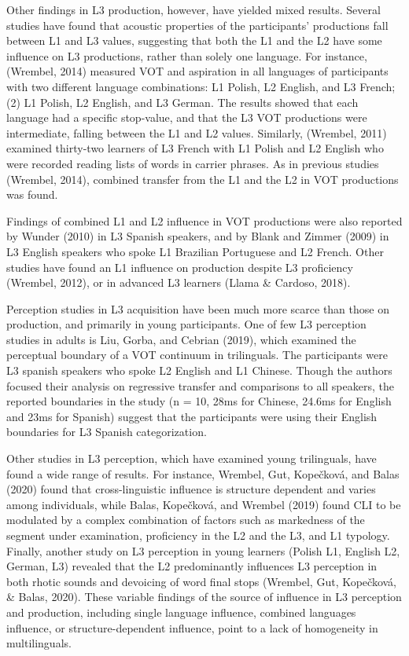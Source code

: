 \documentclass[
  english,
  man]{apa6}
\begin{document}
Other findings in L3 production, however, have yielded mixed results.
Several studies have found that acoustic properties of the participants' productions fall between L1 and L3 values, suggesting that both the L1 and the L2 have some influence on L3 productions, rather than solely one language.
For instance, (Wrembel, 2014) measured VOT and aspiration in all languages of participants with two different language combinations: L1 Polish, L2 English, and L3 French; (2) L1 Polish, L2 English, and L3 German.
The results showed that each language had a specific stop-value, and that the L3 VOT productions were intermediate, falling between the L1 and L2 values.
Similarly, (Wrembel, 2011) examined thirty-two learners of L3 French with L1 Polish and L2 English who were recorded reading lists of words in carrier phrases.
As in previous studies (Wrembel, 2014), combined transfer from the L1 and the L2 in VOT productions was found.

Findings of combined L1 and L2 influence in VOT productions were also reported by Wunder (2010) in L3 Spanish speakers, and by Blank and Zimmer (2009) in L3 English speakers who spoke L1 Brazilian Portuguese and L2 French.
Other studies have found an L1 influence on production despite L3 proficiency (Wrembel, 2012), or in advanced L3 learners (Llama \& Cardoso, 2018).

Perception studies in L3 acquisition have been much more scarce than those on production, and primarily in young participants.
One of few L3 perception studies in adults is Liu, Gorba, and Cebrian (2019), which examined the perceptual boundary of a VOT continuum in trilinguals.
The participants were L3 spanish speakers who spoke L2 English and L1 Chinese.
Though the authors focused their analysis on regressive transfer and comparisons to all speakers, the reported boundaries in the study (n = 10, 28ms for Chinese, 24.6ms for English and 23ms for Spanish) suggest that the participants were using their English boundaries for L3 Spanish categorization.

Other studies in L3 perception, which have examined young trilinguals, have found a wide range of results.
For instance, Wrembel, Gut, Kopečková, and Balas (2020) found that cross-linguistic influence is structure dependent and varies among individuals, while Balas, Kopečková, and Wrembel (2019) found CLI to be modulated by a complex combination of factors such as markedness of the segment under examination, proficiency in the L2 and the L3, and L1 typology.
Finally, another study on L3 perception in young learners (Polish L1, English L2, German, L3) revealed that the L2 predominantly influences L3 perception in both rhotic sounds and devoicing of word final stops (Wrembel, Gut, Kopečková, \& Balas, 2020). These variable findings of the source of influence in L3 perception and production, including single language influence, combined languages influence, or structure-dependent influence, point to a lack of homogeneity in multilinguals.
\end{document}
